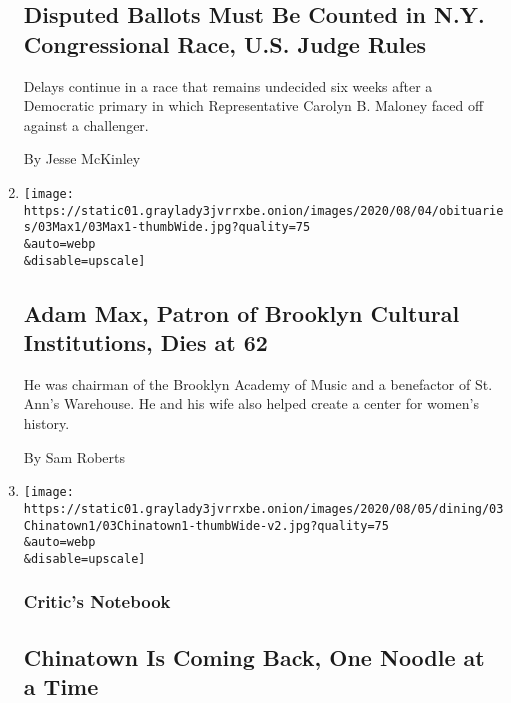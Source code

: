 \begin{enumerate}
{  \subsection{Disputed Ballots Must Be Counted in N.Y. Congressional
  Race, U.S. Judge
  Rules}\label{disputed-ballots-must-be-counted-in-ny-congressional-race-us-judge-rules}}

  Delays continue in a race that remains undecided six weeks after a
  Democratic primary in which Representative Carolyn B. Maloney faced
  off against a challenger.

  By Jesse McKinley
\item
  \href{/2020/08/03/arts/adam-max-patron-of-brooklyn-cultural-institutions-dies-at-62.html}{}

  \texttt{[image: https://static01.graylady3jvrrxbe.onion/images/2020/08/04/obituaries/03Max1/03Max1-thumbWide.jpg?quality=75\\\&auto=webp\\\&disable=upscale]}

  \hypertarget{adam-max-patron-of-brooklyn-cultural-institutions-dies-at-62}{%
  \subsection{Adam Max, Patron of Brooklyn Cultural Institutions, Dies
  at
  62}\label{adam-max-patron-of-brooklyn-cultural-institutions-dies-at-62}}

  He was chairman of the Brooklyn Academy of Music and a benefactor of
  St. Ann's Warehouse. He and his wife also helped create a center for
  women's history.

  By Sam Roberts
\item
  \href{/2020/08/03/dining/chinatown-outdoor-dining-coronavirus.html}{}

  \texttt{[image: https://static01.graylady3jvrrxbe.onion/images/2020/08/05/dining/03Chinatown1/03Chinatown1-thumbWide-v2.jpg?quality=75\\\&auto=webp\\\&disable=upscale]}

  \hypertarget{critics-notebook}{%
  \subsubsection{Critic's Notebook}\label{critics-notebook}}

  \hypertarget{chinatown-is-coming-back-one-noodle-at-a-time}{%
  \subsection{Chinatown Is Coming Back, One Noodle at a
  Time}\label{chinatown-is-coming-back-one-noodle-at-a-time}}


\end{enumerate}
